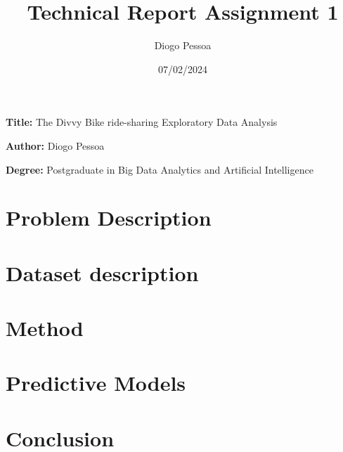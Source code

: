 \documentclass[12pt, a4paper]{article}
\title{Technical Report Assignment 1}
\author{Diogo Pessoa}
\date{07/02/2024}
\newcommand{\namelistlabel}[1]{\mbox{#1}\hfil}
\newenvironment{namelist}[1]{%
    \begin{list}{}
    {
        \let\makelabel\namelistlabel
        \settowidth{\labelwidth}{#1}
        \setlength{\leftmargin}{1.1\labelwidth}
    }
    }{%
    \end{list}}
\begin{document}
    \maketitle
    \begin{namelist}{xxxxxxxxxxxx}
        \item[\textbf{Title:}]
        The Divvy Bike ride-sharing Exploratory Data Analysis
        \item[\textbf{Author:}]
        Diogo Pessoa
        \item[\textbf{Degree:}]
        Postgraduate in Big Data Analytics and Artificial Intelligence
    \end{namelist}

    \section*{Problem Description}
    \label{sec:ProblemDescription}
    

    \section*{Dataset description}
    \label{sec:dataset}
    

    \section*{Method}\label{sec:method}
    
    \section{Predictive Models}\label{sec:predictive-models}
    

    \section*{Conclusion}\label{sec:conclusion}
    
\end{document}
